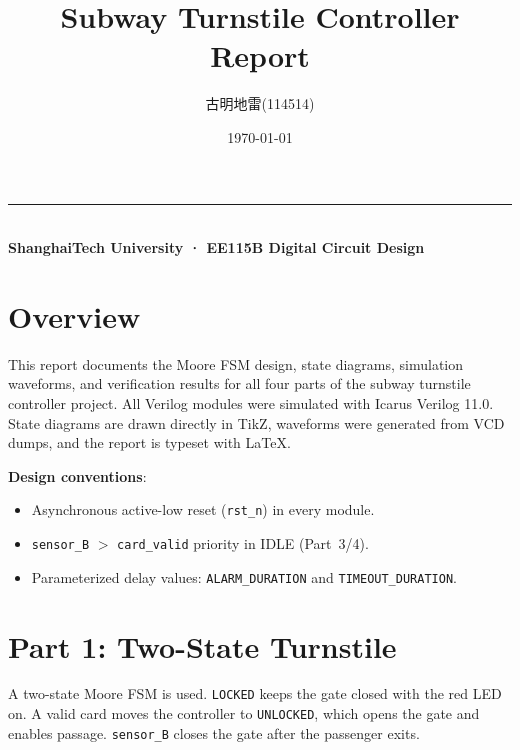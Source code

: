 \documentclass[12pt,a4paper]{ctexart}
\title{\textbf{Subway Turnstile Controller Report}}
\author{古明地雷\quad (114514)}
\date{\today}
\begin{document}
\maketitle
\thispagestyle{empty}

\vspace{-1.5em}
\begin{center}
\rule{0.9\textwidth}{0.5pt}\\[0.3em]
{\small \textbf{ShanghaiTech University · EE115B Digital Circuit Design}}
\end{center}

\section*{Overview}

This report documents the Moore FSM design, state diagrams, simulation
waveforms, and verification results for all four parts of the subway
turnstile controller project. All Verilog modules were simulated with
Icarus Verilog 11.0. State diagrams are drawn directly in TikZ,
waveforms were generated from VCD dumps, and the report is typeset
with \LaTeX{}.

\medskip
\noindent\textbf{Design conventions}:
\begin{itemize}[nosep]
  \item Asynchronous active-low reset (\texttt{rst\_n}) in every module.
  \item \texttt{sensor\_B} $>$ \texttt{card\_valid} priority in IDLE
        (Part~3/4).
  \item Parameterized delay values: \texttt{ALARM\_DURATION} and
        \texttt{TIMEOUT\_DURATION}.
\end{itemize}

\newpage

\section{Part 1: Two-State Turnstile}

A two-state Moore FSM is used. \texttt{LOCKED} keeps the gate closed
with the red LED on. A valid card moves the controller to
\texttt{UNLOCKED}, which opens the gate and enables passage.
\texttt{sensor\_B} closes the gate after the passenger exits.
\end{document}
